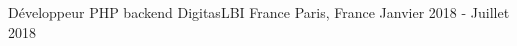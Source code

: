 \cventry
{Développeur PHP backend} %
{DigitasLBI France} %
{Paris, France} %
{Janvier 2018 - Juillet 2018} %
{
\begin{cvitems} %
    \item
    {
    }
\end{cvitems}
}